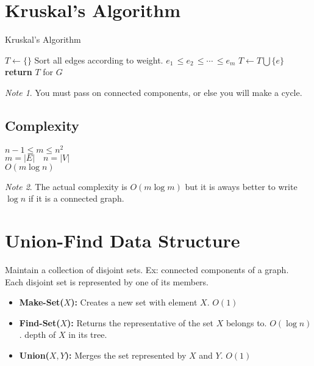 \documentclass{article}
\theoremstyle{definition}
\theoremstyle{remark}
\newtheorem{note}{Note}[section]
\theoremstyle{plain}
\begin{document}
\section{Kruskal's Algorithm}

\begin{algorithm}
\caption{Kruskal's Algorithm}\label{Kruskal's Algorithm to find MST}
\begin{algorithmic}[1]
	\State $T \gets \{\}$
	\State Sort all edges according to weight. $e_1\, \leq e_2\, \leq \cdots \, \leq e_m$	
			\State $T \gets T \bigcup \{e\}$
		\EndIf
	\EndFor
	\State \textbf{return} $T$ for $G$
\EndProcedure
\end{algorithmic}
\end{algorithm}

\begin{note}
You must pass on connected components, or else you will make a cycle.
\end{note}

\subsection{Complexity}
$n-1 \leq m \leq n^2$\\
$m = |E| \quad n = |V|$\\
$O (m \log n)$  
\begin{note}
The actual complexity is $O(m \log m)$ but it is aways better to write $\log n$ if it is a connected graph.
\end{note}

\section{Union-Find Data Structure}
Maintain a collection of disjoint sets. Ex: connected components of a graph.\\
Each disjoint set is represented by one of its members.\\

\begin{itemize}
	\item \textbf{Make-Set($X$):} Creates a new set with element $X$. $O(1)$
	\item \textbf{Find-Set($X$):} Returns the representative of the set $X$ belongs to. $O(\log n)$. depth of $X$ in its tree.
	\item \textbf{Union($X,Y$):} Merges the set represented by $X$ and $Y$. $O(1)$
\end{itemize}
\end{document}
